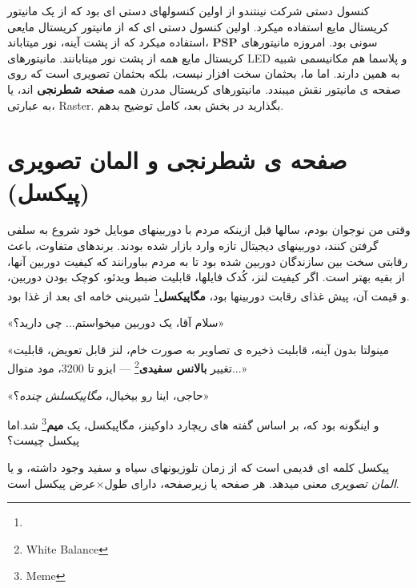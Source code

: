 \documentclass[14pt,a4paper]{memoir}
\begin{document}
کنسول دستی \textbf{} شرکت نینتندو از اولین کنسولهای دستی ای بود که از یک مانیتور کریستال مایع استفاده میکرد. اولین کنسول دستی ای که از مانیتور کریستال مایعی استفاده میکرد که از پشت آینه، نور میتاباند، \textbf{PSP} سونی بود. امروزه مانیتورهای کریستال مایع همه از پشت نور میتابانند. مانیتورهای LED و پلاسما هم مکانیسمی شبیه به همین دارند. اما ما، بحثمان سخت افزار نیست، بلکه بحثمان تصویری است که روی صفحه ی مانیتور نقش میبندد. مانیتورهای کریستال مدرن همه \textbf{صفحه شطرنجی} اند، یا به عبارتی، Raster. بگذارید در بخش بعد، کامل توضیح بدهم.


	 
	 \section{ صفحه ی شطرنجی و المان تصویری (پیکسل)}\label{raster}
	 وقتی من نوجوان بودم، سالها قبل ازینکه مردم با دوربینهای موبایل خود شروع به سلفی گرفتن کنند، دوربینهای دیجیتال تازه وارد بازار شده بودند. برندهای متفاوت، باعث رقابتی سخت بین سازندگان دوربین شده بود تا به مردم بباورانند که کیفیت دوربین آنها، از بقیه بهتر است. اگر کیفیت لنز، کُدک فایلها، قابلیت ضبط ویدئو، کوچک بودن دوربین، و قیمت آن، پیش غذای رقابت دوربینها بود، \textbf{مگاپیکسل}\footnote{} شیرینی خامه ای بعد از غذا بود. 
	 
	 «سلام آقا، یک دوربین میخواستم... چی دارید؟»
	 
	 «مینولتا بدون آینه، قابلیت ذخیره ی تصاویر به صورت خام، لنز قابل تعویض، قابلیت تغییر \textbf{بالانس سفیدی}\footnote{White Balance} --- ایزو تا 3200، مود منوال...»
	 
	«حاجی، اینا رو بیخیال، \textit{مگاپیکسلش چنده}؟»
	 
	 
	 و اینگونه بود که، بر اساس گفته های ریچارد داوکینز، مگاپیکسل، یک \textbf{میم}\footnote{Meme} شد.اما پیکسل چیست؟
	 
	 پیکسل کلمه ای قدیمی است که از زمان تلوزیونهای سیاه و سفید وجود داشته، و  یا \textit{المان تصویری} معنی میدهد. هر صفحه یا زیرصفحه، دارای طول$ \times $عرض پیکسل است.
	 
\end{document}
